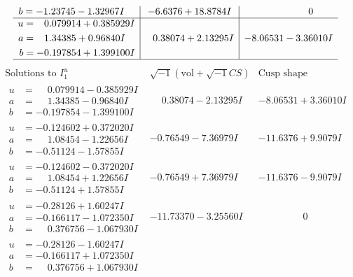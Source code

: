 \documentclass[1p]{elsarticle_modified}
\theoremstyle{definition}
\newcommand{\I}{\sqrt{-1}}
\begin{document}
$$\begin{array}{c|c|c}
\begin{aligned}
b &= -1.23745 - 1.32967 I\end{aligned}
 & -6.6376 + 18.8784 I & \phantom{-0.000000 } 0 \\ \hline\begin{aligned}
u &= \phantom{-}0.079914 + 0.385929 I \\
a &= \phantom{-}1.34385 + 0.96840 I \\
b &= -0.197854 + 1.399100 I\end{aligned}
 & \phantom{-}0.38074 + 2.13295 I & -8.06531 - 3.36010 I\\
 \hline 
 \end{array}$$\newpage$$\begin{array}{c|c|c}  
\text{Solutions to }I^u_{1}& \I (\text{vol} + \sqrt{-1}CS) & \text{Cusp shape}\\
 \hline 
\begin{aligned}
u &= \phantom{-}0.079914 - 0.385929 I \\
a &= \phantom{-}1.34385 - 0.96840 I \\
b &= -0.197854 - 1.399100 I\end{aligned}
 & \phantom{-}0.38074 - 2.13295 I & -8.06531 + 3.36010 I \\ \hline\begin{aligned}
u &= -0.124602 + 0.372020 I \\
a &= \phantom{-}1.08454 - 1.22656 I \\
b &= -0.51124 - 1.57855 I\end{aligned}
 & -0.76549 - 7.36979 I & -11.6376 + 9.9079 I \\ \hline\begin{aligned}
u &= -0.124602 - 0.372020 I \\
a &= \phantom{-}1.08454 + 1.22656 I \\
b &= -0.51124 + 1.57855 I\end{aligned}
 & -0.76549 + 7.36979 I & -11.6376 - 9.9079 I \\ \hline\begin{aligned}
u &= -0.28126 + 1.60247 I \\
a &= -0.166117 - 1.072350 I \\
b &= \phantom{-}0.376756 - 1.067930 I\end{aligned}
 & -11.73370 - 3.25560 I & \phantom{-0.000000 } 0 \\ \hline\begin{aligned}
u &= -0.28126 - 1.60247 I \\
a &= -0.166117 + 1.072350 I \\
b &= \phantom{-}0.376756 + 1.067930 I\end{aligned}

\end{array}$$
\end{document}
